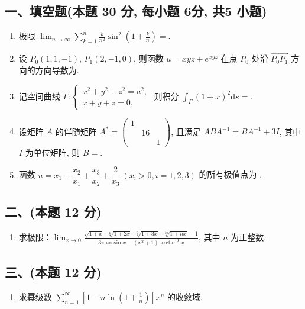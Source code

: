 \subsection*{一、填空题(本题 30 分,  每小题 6分,  共5 小题)}
\begin{enumerate}
    \item 极限 $\displaystyle\lim_{n \to \infty} \sum_{k=1}^{n} \frac{k}{n^2} \sin^2 \left( 1 + \frac{k}{n} \right) =$\underline{\quad \quad}.
    \item 设 $P_0(1, 1, -1)$, $P_1(2, -1, 0)$, 则函数 $u = xyz + e^{xyz}$ 在点 $P_0$ 处沿 $\overrightarrow{P_0 P_1}$ 方向的方向导数为\underline{\quad \quad}.
    \item 记空间曲线 $\Gamma:
              \begin{cases}
                  x^2 + y^2 + z^2 = a^2, \\
                  x + y + z = 0,
              \end{cases}$
          则积分 $\displaystyle\int_{\Gamma} (1 + x)^2 \mathrm{d}s =$\underline{\quad \quad}.
    \item 设矩阵 $A$ 的伴随矩阵 $A^* = \begin{pmatrix}
                  1 &    &   \\
                    & 16 &   \\
                    &    & 1
              \end{pmatrix}$, 且满足 $ABA^{-1} = BA^{-1} + 3I$,
          其中 $I$ 为单位矩阵, 则 $B =$\underline{\quad \quad}.
    \item 函数 $u = x_1 + \dfrac{x_2}{x_1} + \dfrac{x_3}{x_2} + \dfrac{2}{x_3} \ (x_i > 0, i = 1, 2, 3)$ 的所有极值点为 \underline{\quad \quad}.
\end{enumerate}

\subsection*{二、(本题 12 分)}
\begin{enumerate}[start=6]
    \item 求极限：$\displaystyle\lim_{x \to 0} \frac{\sqrt{1 + x} \cdot \sqrt[4]{1 + 2x} \cdot \sqrt[6]{1 + 3x} \cdots \sqrt[2n]{1 + nx} - 1}{3\pi \arcsin x - (x^2 + 1) \arctan^3 x}$, 其中 $n$ 为正整数.
\end{enumerate}

\subsection*{三、(本题 12 分)}
\begin{enumerate}[start=7]
    \item 求幂级数 $\displaystyle\sum_{n=1}^{\infty} \left[ 1 - n \ln \left( 1 + \frac{1}{n} \right) \right] x^n$ 的收敛域.
\end{enumerate}

